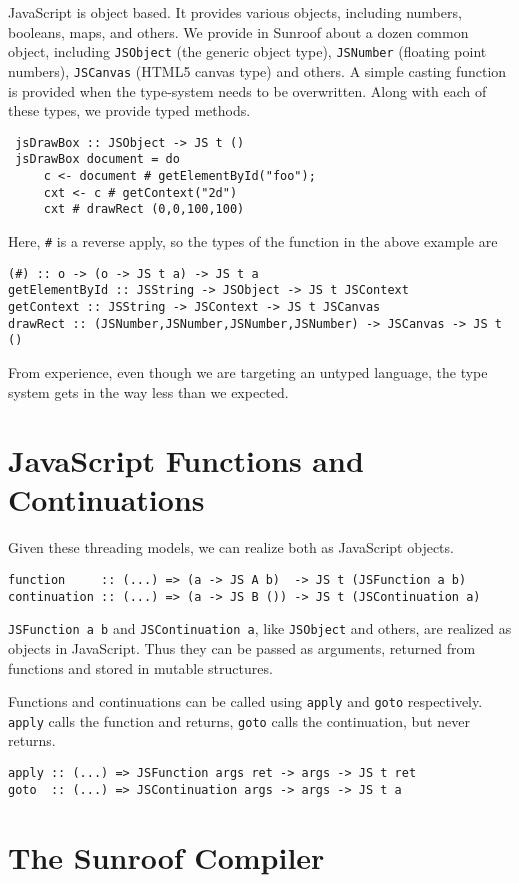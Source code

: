 \documentclass{llncs}
\newcommand{\Src}[1]{{\tt{#1}}}
\begin{document}
JavaScript is object based. It provides various objects,
including numbers, booleans, maps, and others. We
provide in Sunroof about a dozen common object,
including \Src{JSObject} (the generic object type), \Src{JSNumber}
(floating point numbers), \Src{JSCanvas} (HTML5 canvas type) 
and others. A simple
casting function is provided when the type-system
needs to be overwritten. Along with each of these types,
we provide typed methods.
\begin{verbatim}
 jsDrawBox :: JSObject -> JS t ()
 jsDrawBox document = do
     c <- document # getElementById("foo");
     cxt <- c # getContext("2d")
     cxt # drawRect (0,0,100,100)
\end{verbatim}
Here, \Src{\#} is a reverse apply, so the types
of the function in the above example are
\begin{verbatim}
(#) :: o -> (o -> JS t a) -> JS t a
getElementById :: JSString -> JSObject -> JS t JSContext
getContext :: JSString -> JSContext -> JS t JSCanvas
drawRect :: (JSNumber,JSNumber,JSNumber,JSNumber) -> JSCanvas -> JS t ()
\end{verbatim}        
From experience, even though we are targeting
an untyped language, the type system gets in the
way less than we expected.

\section{JavaScript Functions and Continuations}

Given these threading models, we can realize both as 
JavaScript objects. 
\begin{verbatim}
function     :: (...) => (a -> JS A b)  -> JS t (JSFunction a b)
continuation :: (...) => (a -> JS B ()) -> JS t (JSContinuation a)
\end{verbatim}
\Src{JSFunction a b} and \Src{JSContinuation a},
like \Src{JSObject} and others, are realized as objects
in JavaScript. Thus they can be passed as arguments, returned
from functions and stored in mutable structures.

Functions and continuations can be called using \Src{apply}
and \Src{goto} respectively. \Src{apply} calls the function
and returns, \Src{goto} calls the continuation, but never
returns.
\begin{verbatim}
apply :: (...) => JSFunction args ret -> args -> JS t ret
goto  :: (...) => JSContinuation args -> args -> JS t a
\end{verbatim}

\section{The Sunroof Compiler}
\end{document}

